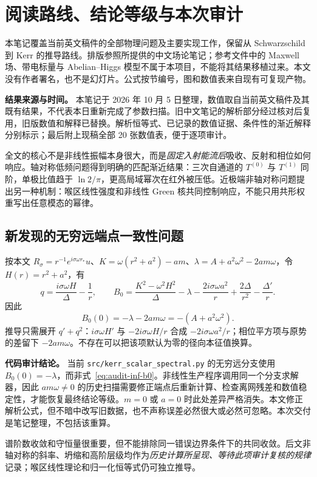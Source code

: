\section{阅读路线、结论等级与本次审计}
本笔记覆盖当前英文稿件的全部物理问题及主要实现工作，保留从 Schwarzschild 到 Kerr 的推导路线。排版参照所提供的中文场论笔记；参考文件中的 Maxwell 场、带电标量与 Abelian--Higgs 模型不属于本项目，不能将其结果移植过来。本文没有作者署名，也不是幻灯片。公式按节编号，图和数值表来自现有可复现产物。

\begin{note}
\textbf{结果来源与时间。} 本笔记于 2026 年 10 月 5 日整理，数值取自当前英文稿件及其既有结果，不代表本日重新完成了参数扫描。旧中文笔记的解析部分经过核对后复用，旧版数值和解释已替换。解析恒等式、已记录的数值证据、条件性的渐近解释分别标示；最后附上现稿全部 20 张数值表，便于逐项审计。
\end{note}

全文的核心不是非线性振幅本身很大，而是\emph{固定入射能流后}吸收、反射和相位如何响应。轴对称低频问题得到明确的匹配渐近结果：三次自通道的 $T^{(0)}$ 与 $T^{(1)}$ 同阶，单极比值趋于 $\ln2/\pi$，更高局域幂次在红外被压低。近极端非轴对称问题提出另一种机制：喉区线性强度和非线性 Green 核共同控制响应，不能只用共形权重写出任意模态的幂律。

\subsection{新发现的无穷远端点一致性问题}
按本文 $R_\sigma=r^{-1}e^{i\sigma\omega r_*}u$、$K=\omega(r^2+a^2)-am$、$\lambda=A+a^2\omega^2-2am\omega$，令 $H(r)=r^2+a^2$，有
\begin{equation}
 q=\frac{i\sigma\omega H}{\Delta}-\frac1r,
 \qquad
 B_0=\frac{K^2-\omega^2H^2}{\Delta}-\lambda
       -\frac{2i\sigma\omega a^2}{r}
       +\frac{2\Delta}{r^2}-\frac{\Delta'}r.
\label{eq:audit-exact-b0}
\end{equation}
因此
\begin{equation}
 \boxed{B_0(0)=-\lambda-2am\omega=-(A+a^2\omega^2).}
\label{eq:audit-inf-b0}
\end{equation}
推导只需展开 $q'+q^2$：$i\sigma\omega H'$ 与 $-2i\sigma\omega H/r$ 合成 $-2i\sigma\omega a^2/r$；相位平方项与原势的差留下 $-2am\omega$。不存在可以把该项默认为零的径向本征值换算。

\begin{note}
\textbf{代码审计结论。} 当前 \texttt{src/kerr\_scalar\_spectral.py} 的无穷远分支使用 $B_0(0)=-\lambda$，而非式~\eqref{eq:audit-inf-b0}。非线性生产程序调用同一个分支求解器，因此 $am\omega\ne0$ 的历史扫描需要修正端点后重新计算、检查离网残差和数值稳定性，才能恢复最终结论等级。$m=0$ 或 $a=0$ 时此处差异严格消失。本文修正解析公式，但不暗中改写旧数据，也不声称误差必然很大或必然可忽略。本次交付是笔记整理，不包括该重算。
\end{note}
谱阶数收敛和守恒量很重要，但不能排除同一错误边界条件下的共同收敛。后文非轴对称的斜率、坍缩和高阶层级均作为\emph{历史计算所呈现、等待此项审计复核的规律}记录；喉区线性理论和归一化恒等式仍可独立推导。

